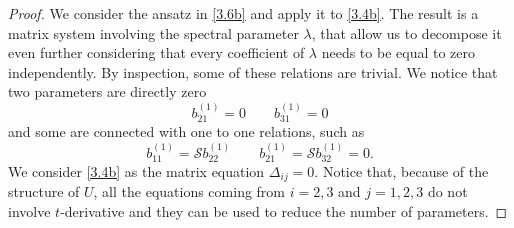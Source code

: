 \documentclass{article}
\numberwithin{equation}{section}
\begin{document}
	\begin{proof}
		We consider the ansatz in \eqref{3.6b} and apply it to 
\eqref{3.4b}. The result is a matrix system involving the spectral parameter 
$\lambda$, that allow us to decompose it even further considering that every 
coefficient of $\lambda$ needs to be equal to zero independently. By inspection, 
some of these relations are trivial. We notice that two parameters are 
directly zero
		\begin{equation}
			b_{21}^{(1)}=0 \qquad b_{31}^{(1)}=0
			\label{5.2}
		\end{equation}
		and some are connected with one to one relations, such as
		\begin{equation}
			b^{(1)}_{11}= \mathcal{S} b^{(1)}_{22} \qquad 
b^{(1)}_{21}=\mathcal{S}b^{(1)}_{32}=0 .
			\label{5.3}
		\end{equation}
We consider \eqref{3.4b} as the matrix equation $\Delta_{  
ij}=0$. Notice that, because of the structure of $U$, all the 
equations coming from $i=2, 3$ and $j=1, 2, 3$ do not involve 
$t$-derivative and they can be used to reduce the number of parameters.


\end{proof}
\end{document}
